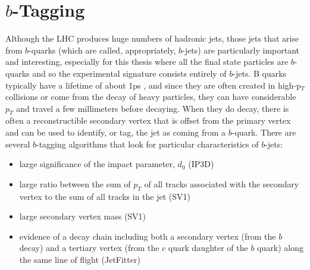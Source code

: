 \section{$b$-Tagging}
\label{sec:b-tag}

Although the LHC produces huge numbers of hadronic jets, those jets that arise from $b$-quarks
(which are called, appropriately, $b$-jets) are particularly important and interesting,
especially for this thesis where all the final state particles are $b$-quarks and so the 
experimental signature consists entirely of $b$-jets.
B quarks typically have a lifetime of about 1ps
, and since they are often created in high-p$_T$ collisions or come from the decay 
of heavy particles, they can have considerable $p_T$ and travel a few millimeters before decaying.
When they do decay, there is often a reconstructible secondary vertex that is offset from
the primary vertex and can be used to identify, or tag, the jet as coming from a $b$-quark.  
There are several $b$-tagging algorithms that look for particular characteristics of $b$-jets:





\begin{itemize}
	\item large significance of the impact parameter, $d_0$ (IP3D)
	\item large ratio between the sum of $p_T$ of all tracks associated with the secondary vertex to the sum of all tracks in the jet (SV1)
	\item large secondary vertex mass (SV1)
	\item evidence of a decay chain including both a secondary vertex (from the $b$ decay) and a tertiary vertex (from the $c$ quark daughter of the $b$ quark) along the same line of flight (JetFitter)
\end{itemize}

